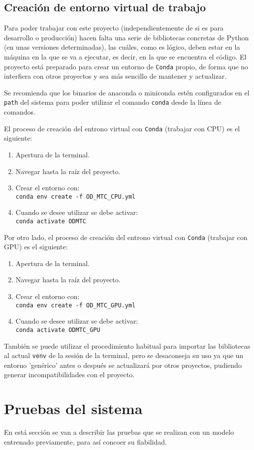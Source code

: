 \subsection{Creación de entorno virtual de trabajo}
Para poder trabajar con este proyecto (independientemente de si es para desarrollo o producción) hacen falta una serie de bibliotecas concretas de Python (en unas versiones determinadas), las cuáles, como es lógico, deben estar en la máquina en la que se va a ejecutar, es decir, en la que se encuentra el código. 
El proyecto está preparado para crear un entorno de \texttt{Conda} propio, de forma que no interfiera con otros proyectos y sea más sencillo de mantener y actualizar.

Se recomienda que los binarios de anaconda o miniconda estén configurados en el \texttt{path} del sistema para poder utilizar el comando \texttt{conda} desde la línea de comandos.

El proceso de creación del entrono virtual con \texttt{Conda} (trabajar con CPU) es el siguiente:
\begin{enumerate}
\tightlist
\item Apertura de la terminal.
\item Navegar hasta la raíz del proyecto.
\item Crear el entorno con:\\
\texttt{conda env create -f OD\_MTC\_CPU.yml}
\item Cuando se desee utilizar se debe activar:\\
\texttt{conda activate ODMTC}
\end{enumerate}

Por otro lado, el proceso de creación del entrono virtual con \texttt{Conda} (trabajar con GPU) es el siguiente:
\begin{enumerate}
\tightlist
\item Apertura de la terminal.
\item Navegar hasta la raíz del proyecto.
\item Crear el entorno con:\\
\texttt{conda env create -f OD\_MTC\_GPU.yml}
\item Cuando se desee utilizar se debe activar:\\
\texttt{conda activate ODMTC\_GPU}
\end{enumerate}

También se puede utilizar el procedimiento habitual para importar las bibliotecas al actual \texttt{venv} de la sesión de la terminal, pero se desaconseja su uso ya que un entorno 'genérico' antes o después se actualizará por otros proyectos, pudiendo generar incompatibilidades con el proyecto.

\section{Pruebas del sistema}
En está sección se van a describir las pruebas que se realizan con un modelo entrenado previamente, para así concoer su fiabilidad.